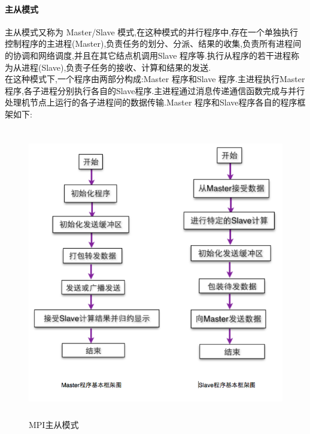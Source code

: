 \documentclass[paper=a4]{ctexart} %
\numberwithin{equation}{section} %
\numberwithin{figure}{section} %
\numberwithin{table}{section} %
\newcommand{\n}{\\\indent}
\begin{document}
\paragraph{主从模式}
主从模式又称为 Master/Slave 模式,在这种模式的并行程序中,存在一个单独执行控制程序的主进程(Master),负责任务的划分、分派、结果的收集,负责所有进程间的协调和网络调度,并且在其它结点机调用Slave 程序等.执行从程序的若干进程称为从进程(Slave),负责子任务的接收、计算和结果的发送.\n
在这种模式下,一个程序由两部分构成:Master 程序和Slave 程序.主进程执行Master 程序,各子进程分别执行各自的Slave程序.主进程通过消息传递通信函数完成与并行处理机节点上运行的各子进程间的数据传输.Master 程序和Slave程序各自的程序框架如下:
\begin{figure}[htbp]
\centering
\includegraphics[width=4.8in,height=5in]{pic/MPI-master-slave.png}
\caption{MPI主从模式}
\end{figure}
\end{document}
